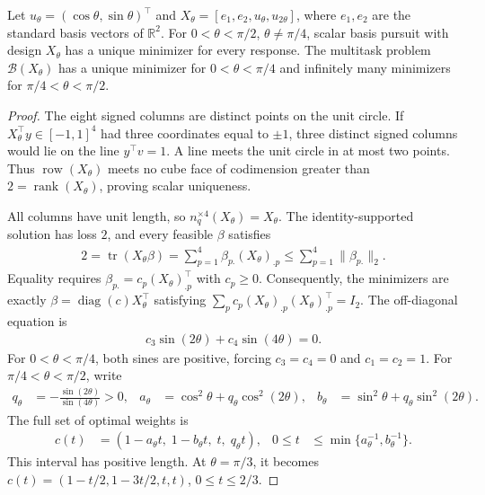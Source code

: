 \begin{example}
\label{example:rotation_nonuniqueness}
Let $u_\theta=(\cos\theta,\sin\theta)^\top$ and $X_\theta=[e_1,e_2,u_\theta,u_{2\theta}]$, where $e_1,e_2$ are the standard basis vectors of $\mathbb R^2$.
For $0<\theta<\pi/2$, $\theta\neq\pi/4$, scalar basis pursuit with design $X_\theta$ has a unique minimizer for every response.
The multitask problem $\mathcal B(X_\theta)$ has a unique minimizer for $0<\theta<\pi/4$ and infinitely many minimizers for $\pi/4<\theta<\pi/2$.
\end{example}

\begin{proof}
The eight signed columns are distinct points on the unit circle.
If $X_\theta^\top y\in[-1,1]^4$ had three coordinates equal to $\pm1$, three distinct signed columns would lie on the line $y^\top v=1$.
A line meets the unit circle in at most two points.
Thus $\operatorname{row}(X_\theta)$ meets no cube face of codimension greater than $2=\operatorname{rank}(X_\theta)$, proving scalar uniqueness.

All columns have unit length, so $n_q^{\times4}(X_\theta)=X_\theta$.
The identity-supported solution has loss $2$, and every feasible $\beta$ satisfies
\begin{align}
2=\operatorname{tr}(X_\theta\beta)
=\sum_{p=1}^4\beta_{p.}(X_\theta)_{.p}
\leq\sum_{p=1}^4\|\beta_{p.}\|_2.
\end{align}
Equality requires $\beta_{p.}=c_p(X_\theta)_{.p}^\top$ with $c_p\geq0$.
Consequently, the minimizers are exactly $\beta=\operatorname{diag}(c)X_\theta^\top$ satisfying $\sum_p c_p(X_\theta)_{.p}(X_\theta)_{.p}^\top=I_2$.
The off-diagonal equation is
\begin{align}
c_3\sin(2\theta)+c_4\sin(4\theta)=0.
\end{align}
For $0<\theta<\pi/4$, both sines are positive, forcing $c_3=c_4=0$ and $c_1=c_2=1$.
For $\pi/4<\theta<\pi/2$, write
\begin{align}
q_\theta&=-\frac{\sin(2\theta)}{\sin(4\theta)}>0, &
a_\theta&=\cos^2\theta+q_\theta\cos^2(2\theta), &
b_\theta&=\sin^2\theta+q_\theta\sin^2(2\theta).
\end{align}
The full set of optimal weights is
\begin{align}
c(t)&=(1-a_\theta t,\;1-b_\theta t,\;t,\;q_\theta t), &
0\leq t&\leq\min\{a_\theta^{-1},b_\theta^{-1}\}.
\end{align}
This interval has positive length.
At $\theta=\pi/3$, it becomes $c(t)=(1-t/2,1-3t/2,t,t)$, $0\leq t\leq2/3$.
\end{proof}

